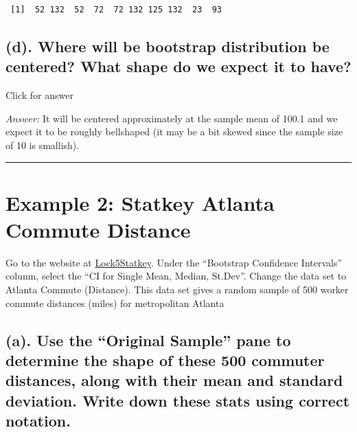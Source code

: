 \documentclass[
]{book}
\begin{document}
\begin{verbatim}
 [1]  52 132  52  72  72 132 125 132  23  93
\end{verbatim}

\hypertarget{d.-where-will-be-bootstrap-distribution-be-centered-what-shape-do-we-expect-it-to-have}{%
\subsection{(d). Where will be bootstrap distribution be centered? What shape do we expect it to have?}\label{d.-where-will-be-bootstrap-distribution-be-centered-what-shape-do-we-expect-it-to-have}}

Click for answer

\emph{Answer:} It will be centered approximately at the sample mean of 100.1 and we expect it to be roughly bellshaped (it may be a bit skewed since the sample size of 10 is smallish).

\begin{center}\rule{0.5\linewidth}{0.5pt}\end{center}

\hypertarget{example-2-statkey-atlanta-commute-distance}{%
\section{Example 2: Statkey Atlanta Commute Distance}\label{example-2-statkey-atlanta-commute-distance}}

Go to the website at \href{http://www.lock5stat.com/StatKey/}{Lock5Statkey}. Under the ``Bootstrap Confidence Intervals'' column, select the ``CI for Single Mean, Median, St.Dev''. Change the data set to Atlanta Commute (Distance). This data set gives a random sample of 500 worker commute distances (miles) for metropolitan Atlanta

\hypertarget{a.-use-the-original-sample-pane-to-determine-the-shape-of-these-500-commuter-distances-along-with-their-mean-and-standard-deviation.-write-down-these-stats-using-correct-notation.}{%
\subsection{(a). Use the ``Original Sample'' pane to determine the shape of these 500 commuter distances, along with their mean and standard deviation. Write down these stats using correct notation.}\label{a.-use-the-original-sample-pane-to-determine-the-shape-of-these-500-commuter-distances-along-with-their-mean-and-standard-deviation.-write-down-these-stats-using-correct-notation.}}
\end{document}

